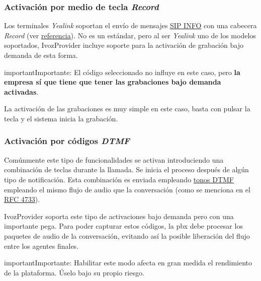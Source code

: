 \documentclass[letterpaper,10pt,spanish]{sphinxmanual}
\begin{document}
\subsubsection{Activación por medio de tecla \emph{Record}}
\label{pbx_features/call_recording:activated-using-the-record-key}
Los terminales \emph{Yealink} soportan el envío de mensajes \href{https://tools.ietf.org/html/rfc6086}{SIP INFO} con una cabecera \emph{Record} (ver \href{http://www.yealink.com/Upload/document/UsingCallRecordingFeatureonYealinkPhones/UsingCallRecordingFeatureonYealinkSIPT2XPphonesRev\_610-20561729764.pdf}{referencia}). No es un estándar, pero al ser \emph{Yealink} uno de los modelos soportados, IvozProvider incluye soporte para la activación de grabación bajo demanda de esta forma.

\begin{notice}{important}{Importante:}
El código seleccionado no influye en este caso, pero \textbf{la empresa sí que tiene que tener las grabaciones bajo demanda activadas}.
\end{notice}

La activación de las grabaciones es muy simple en este caso, basta con pulsar la tecla y el sistema inicia la grabación.


\subsubsection{Activación por códigos \emph{DTMF}}
\label{pbx_features/call_recording:activated-using-dtmf-codes}
Comúnmente este tipo de funcionalidades se activan introduciendo una combinación de teclas durante la llamada. Se inicia el proceso después de algún tipo de notificación. Esta combinación es enviada empleando \href{https://es.wikipedia.org/wiki/Marcaci\%C3\%B3n\_por\_tonos}{tonos DTMF} empleando el mismo flujo de audio que la conversación (como se menciona en el \href{https://tools.ietf.org/html/rfc4733}{RFC 4733}).

IvozProvider soporta este tipo de activaciones bajo demanda pero con una importante pega. Para poder capturar estos códigos, la pbx debe procesar los paquetes de audio de la conversación, evitando así la posible liberación del flujo entre los agentes finales.

\begin{notice}{important}{Importante:}
Habilitar este modo afecta en gran medida el rendimiento de la plataforma. Úselo bajo su propio riesgo.
\end{notice}
\end{document}
